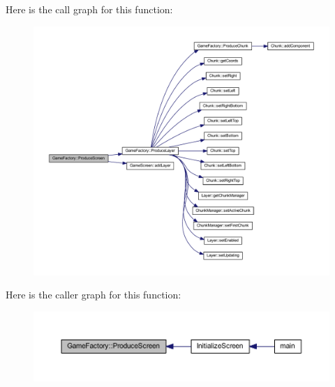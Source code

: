 Here is the call graph for this function\-:
\nopagebreak
\begin{figure}[H]
\begin{center}
\leavevmode
\includegraphics[width=350pt]{class_game_factory_ad293f5a8811d9106753916cef819fbce_cgraph}
\end{center}
\end{figure}




Here is the caller graph for this function\-:\nopagebreak
\begin{figure}[H]
\begin{center}
\leavevmode
\includegraphics[width=350pt]{class_game_factory_ad293f5a8811d9106753916cef819fbce_icgraph}
\end{center}
\end{figure}




